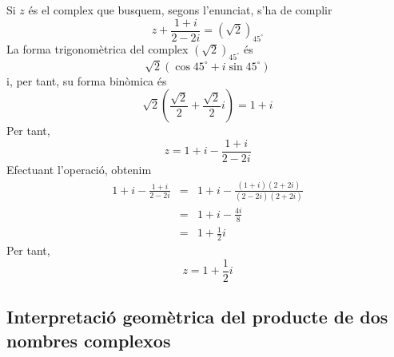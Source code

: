\begin{solucio}
Si $z$ és el complex que busquem, segons l’enunciat, s’ha de complir
\begin{equation*}
z+\frac{1+i}{2-2i}=\left( \sqrt{2}\right) _{45
^{\circ}
}
\end{equation*}
La forma trigonomètrica del complex $\left( \sqrt{2}\right) _{45
^{\circ}
}$ és
\begin{equation*}
\sqrt{2}(\cos 45
^{\circ}
+i\sin 45
^{\circ}
)
\end{equation*}
i, per tant, su forma binòmica és
\begin{equation*}
\sqrt{2}\left( \frac{\sqrt{2}}{2}+\frac{\sqrt{2}}{2}i\right) =1+i
\end{equation*}
Per tant,
\begin{equation*}
z=1+i-\frac{1+i}{2-2i}
\end{equation*}
Efectuant l’operació, obtenim
\begin{eqnarray*}
1+i-\frac{1+i}{2-2i} &=&1+i-\frac{(1+i)(2+2i)}{(2-2i)(2+2i)} \\
&=&1+i-\frac{4i}{8} \\
&=&1+\frac{1}{2}i
\end{eqnarray*}
Per tant,
\begin{equation*}
z=1+\frac{1}{2}i
\end{equation*}
\end{solucio}

\subsection{Interpretació geomètrica del producte de dos nombres complexos}

